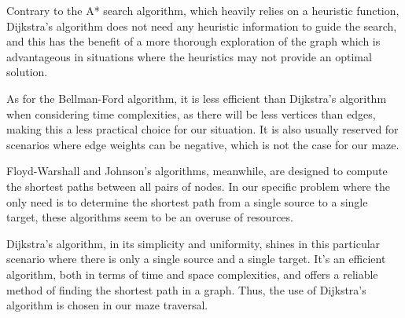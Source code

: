 Contrary to the A* search algorithm, which heavily relies on a heuristic function, Dijkstra's algorithm does not need any heuristic information to guide the search, and this has the benefit of a more thorough exploration of the graph which is advantageous in situations where the heuristics may not provide an optimal solution.

As for the Bellman-Ford algorithm, it is less efficient than Dijkstra's algorithm when considering time complexities, as there will be less vertices than edges, making this a less practical choice for our situation. It is also usually reserved for scenarios where edge weights can be negative, which is not the case for our maze.

Floyd-Warshall and Johnson's algorithms, meanwhile, are designed to compute the shortest paths between all pairs of nodes. In our specific problem where the only need is to determine the shortest path from a single source to a single target, these algorithms seem to be an overuse of resources.

Dijkstra's algorithm, in its simplicity and uniformity, shines in this particular scenario where there is only a single source and a single target. It's an efficient algorithm, both in terms of time and space complexities, and offers a reliable method of finding the shortest path in a graph. Thus, the use of Dijkstra's algorithm is chosen in our maze traversal.